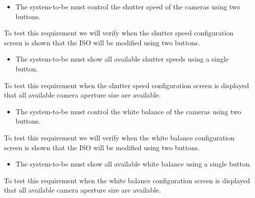 \begin{itemize}
    \item The system-to-be must control the shutter speed of the cameras using two buttons.
\end{itemize}
To test this requirement we will verify when the shutter speed configuration screen is shown that the ISO will be modified using two buttons.
\begin{itemize}
    \item The system-to-be must show all available shutter speeds using a single button.
\end{itemize}
To test this requirement when the shutter speed configuration screen is displayed that all available camera aperture size are available.
\begin{itemize}
    \item The system-to-be must control the white balance of the cameras using two buttons.
\end{itemize}
To test this requirement we will verify when the white balance configuration screen is shown that the ISO will be modified using two buttons.
\begin{itemize}
    \item The system-to-be must show all available white balance using a single button.
\end{itemize}
To test this requirement when the white balance configuration screen is displayed that all available camera aperture size are available.
